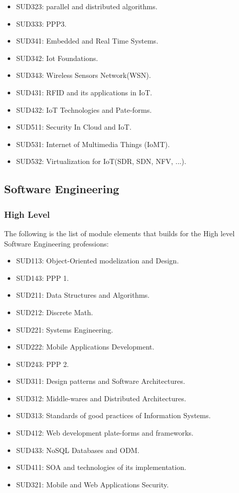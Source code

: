 \documentclass[12pt]{extreport}
\begin{document}
\begin{itemize}
\item SUD323: parallel and distributed algorithms.
\item SUD333: PPP3.
\item SUD341: Embedded and Real Time Systems.
\item SUD342: Iot Foundations.
\item SUD343: Wireless Sensors Network(WSN).
\item SUD431: RFID and its applications in IoT.
\item SUD432: IoT Technologies and Pate-forms.
\item SUD511: Security In Cloud and IoT.
\item SUD531: Internet of Multimedia Things (IoMT).
\item SUD532: Virtualization for IoT(SDR, SDN, NFV, ...).
\end{itemize}

\subsection{Software Engineering}

\subsubsection{High Level}
The following is the list of module elements that builds for the High level Software Engineering professions:

\begin{itemize}
\item SUD113: Object-Oriented modelization and Design.		   %
\item SUD143: PPP 1.										   %
\item SUD211: Data Structures and Algorithms.                  %
\item SUD212: Discrete Math.								   %
\item SUD221: Systems Engineering.							   %
\item SUD222: Mobile Applications Development.				   %
\item SUD243: PPP 2. 										   %
\item SUD311: Design patterns and Software Architectures.      %
\item SUD312: Middle-wares and Distributed Architectures.      %
\item SUD313: Standards of good practices of Information Systems.%
\item SUD412: Web development plate-forms and frameworks.      %
\item SUD433: NoSQL Databases and ODM.						   %
\item SUD411: SOA and technologies of its implementation.      %
\item SUD321: Mobile and Web Applications Security.			   %
\end{itemize}
\end{document}
